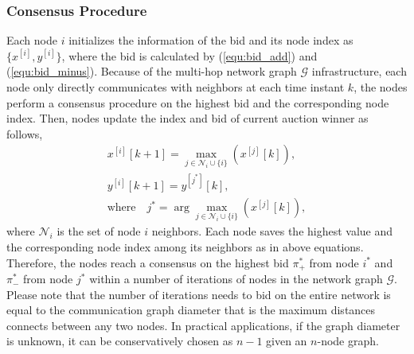 \documentclass[journal]{IEEEtran}  %
\newcommand{\argmax}{\arg\!\max}
\begin{document}
%

\subsubsection{Consensus Procedure}
Each node $i$ initializes the information of the bid and its node index
as $\{x^{[i]},y^{[i]}\}$, where the bid is calculated by
(\ref{equ:bid_add}) and (\ref{equ:bid_minus}).
Because of the multi-hop network graph $\mathcal{G}$ infrastructure, each node
only directly communicates with neighbors at each time instant $k$, the
nodes perform a consensus procedure on the highest bid and the corresponding
node index.  
Then, nodes update the index and bid of current auction winner as follows,
\begin{eqnarray}
x^{[i]}[k+1] = \max_{j\in \mathcal{N}_i \cup \{i\}} (x^{[j]}[k]), \\
\label{equ:bid_value_update}
y^{[i]}[k+1] = y^{[j^*]}[k], \\
\label{equ:bid_index_update}
\text{where} \quad
j^* = \argmax_{j\in \mathcal{N}_i \cup \{i\}} (x^{[j]}[k]),
\label{equ:bid_index}
\end{eqnarray}
where $\mathcal{N}_i$ is the set of node $i$ neighbors.
Each node saves the highest value and the corresponding node index among its
neighbors as in above equations. 
Therefore, the nodes reach a consensus on the highest bid $\pi_+^*$ from node
$i^*$ and $\pi_-^*$ from node $j^*$ within a number of iterations of nodes
in the network graph $\mathcal{G}$. 
Please note that the number of iterations needs to bid on the entire
network is equal to the communication graph diameter that is the maximum
distances connects between any two nodes.  
In practical applications, if the graph diameter is unknown, it can be
conservatively chosen as $n-1$ given an $n$-node graph. 
\end{document}
